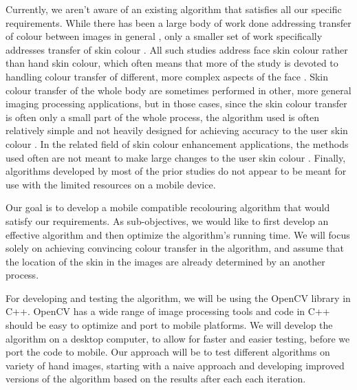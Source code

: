 Currently, we aren't aware of an existing algorithm that satisfies all our specific requirements. While there has been a large body of work done addressing transfer of colour between images in general \cite{reinhard_2001_transfer, pitie_2005_pdf, chen_2014_propagation, chang_2015_palette, zhang_2017_decomposition}, only a smaller set of work specifically addresses transfer of skin colour \cite{yin_2004_transfer, seo_2005_transfer, yang_2017_semantic}. All such studies address face skin colour rather than hand skin colour, which often means that more of the study is devoted to handling colour transfer of different, more complex aspects of the face \cite{yang_2017_semantic}. Skin colour transfer of the whole body are sometimes performed in other, more general imaging processing applications, but in those cases, since the skin colour transfer is often only a small part of the whole process, the algorithm used is often relatively simple and not heavily designed for achieving accuracy to the user skin colour \cite{shilkrot_2013_garment, li_2015_replace}. In the related field of skin colour enhancement applications, the methods used often are not meant to make large changes to the user skin colour \cite{aradhye_2009_enhancement, lee_2010_mobile}. Finally, algorithms developed by most of the prior studies do not appear to be meant for use with the limited resources on a mobile device.

Our goal is to develop a mobile compatible recolouring algorithm that would satisfy our requirements. As sub-objectives, we would like to first develop an effective algorithm and then optimize the algorithm's running time. We will focus solely on achieving convincing colour transfer in the algorithm, and assume that the location of the skin in the images are already determined by an another process. 

For developing and testing the algorithm, we will be using the OpenCV library in C++. OpenCV has a wide range of image processing tools and code in C++ should be easy to optimize and port to mobile platforms. We will develop the algorithm on a desktop computer, to allow for faster and easier testing, before we port the code to mobile. Our approach will be to test different algorithms on variety of hand images, starting with a naive approach and developing improved versions of the algorithm based on the results after each each iteration.